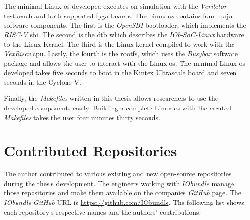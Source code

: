 The minimal Linux \acrshort{os} developed executes on simulation with the \textit{Verilator} testbench and both supported \acrshort{fpga} boards. The Linux \acrshort{os} contains four major software components. The first is the \textit{OpenSBI} bootloader, which implements the \textit{RISC-V} \acrshort{sbi}. The second is the \acrlong{dtb} which describes the \textit{IOb-SoC-Linux} hardware to the Linux Kernel. The third is the Linux kernel compiled to work with the \textit{VexRiscv} \acrshort{cpu}. Lastly, the fourth is the \acrlong{rootfs}, which uses the \textit{Busybox} software package and allows the user to interact with the Linux \acrshort{os}. The minimal Linux \acrshort{os} developed takes five seconds to boot in the Kintex Ultrascale board and seven seconds in the Cyclone V.

Finally, the \textit{Makefiles} written in this thesis allows researchers to use the developed components easily. Building a complete Linux \acrshort{os} with the created \textit{Makefiles} takes the user four minutes thirty seconds.

\section{Contributed Repositories}
\label{section:contributions}
The author contributed to various existing and new open-source repositories during the thesis development. The engineers working with \textit{IObundle} manage those repositories and make them available on the companies \textit{GitHub} page. The \textit{IObundle} \textit{GitHub} URL is \url{https://github.com/IObundle}. The following list shows each repository's respective names and the authors' contributions.

